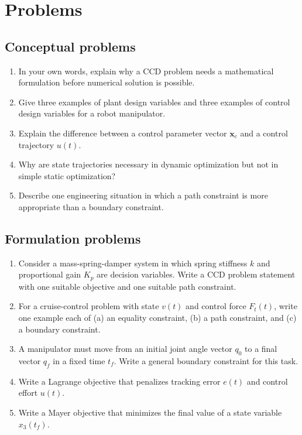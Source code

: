 \documentclass[11pt]{article}
\newcommand{\vect}[1]{\boldsymbol{#1}}
\newcommand{\xc}{\vect{x}_c}
\begin{document}
\section{Problems}

\subsection*{Conceptual problems}
\begin{enumerate}[leftmargin=1.5em,label=\textbf{P\arabic*.}]
  \item In your own words, explain why a CCD problem needs a mathematical formulation before numerical solution is possible.
  \item Give three examples of plant design variables and three examples of control design variables for a robot manipulator.
  \item Explain the difference between a control parameter vector $\xc$ and a control trajectory $u(t)$.
  \item Why are state trajectories necessary in dynamic optimization but not in simple static optimization?
  \item Describe one engineering situation in which a path constraint is more appropriate than a boundary constraint.
\end{enumerate}

\subsection*{Formulation problems}
\begin{enumerate}[leftmargin=1.5em,label=\textbf{P\arabic*.},resume]
  \item Consider a mass-spring-damper system in which spring stiffness $k$ and proportional gain $K_p$ are decision variables. Write a CCD problem statement with one suitable objective and one suitable path constraint.
  \item For a cruise-control problem with state $v(t)$ and control force $F_t(t)$, write one example each of (a) an equality constraint, (b) a path constraint, and (c) a boundary constraint.
  \item A manipulator must move from an initial joint angle vector $q_0$ to a final vector $q_f$ in a fixed time $t_f$. Write a general boundary constraint for this task.
  \item Write a Lagrange objective that penalizes tracking error $e(t)$ and control effort $u(t)$.
  \item Write a Mayer objective that minimizes the final value of a state variable $x_3(t_f)$.
\end{enumerate}
\end{document}
